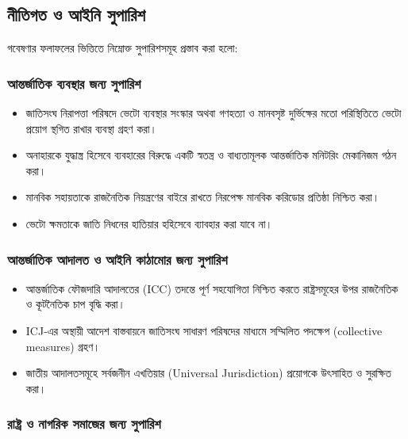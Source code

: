 \subsection{নীতিগত ও আইনি
সুপারিশ}\label{ux9a8ux9a4ux997ux9a4-ux993-ux986ux987ux9a8-ux9b8ux9aaux9b0ux9b6}

গবেষণার ফলাফলের ভিত্তিতে নিম্নোক্ত সুপারিশসমূহ প্রস্তাব করা হলো:

\subsubsection{আন্তর্জাতিক ব্যবস্থার জন্য
সুপারিশ}\label{ux986ux9a8ux9a4ux9b0ux99cux9a4ux995-ux9acux9afux9acux9b8ux9a5ux9b0-ux99cux9a8ux9af-ux9b8ux9aaux9b0ux9b6}

\begin{itemize}
\item
  জাতিসংঘ নিরাপত্তা পরিষদে ভেটো ব্যবস্থার সংস্কার অথবা গণহত্যা ও মানবসৃষ্ট
  দুর্ভিক্ষের মতো পরিস্থিতিতে ভেটো প্রয়োগ স্থগিত রাখার ব্যবস্থা গ্রহণ করা।
\item
  অনাহারকে যুদ্ধাস্ত্র হিসেবে ব্যবহারের বিরুদ্ধে একটি স্বতন্ত্র ও বাধ্যতামূলক
  আন্তর্জাতিক মনিটরিং মেকানিজম গঠন করা।
\item
  মানবিক সহায়তাকে রাজনৈতিক নিয়ন্ত্রণের বাইরে রাখতে নিরপেক্ষ মানবিক করিডোর
  প্রতিষ্ঠা নিশ্চিত করা।
\item ভেটো ক্ষমতাকে জাতি নিধনের হাতিয়ার হহিসেবে ব্যাবহার করা যাবে না। 
\end{itemize}

\subsubsection{আন্তর্জাতিক আদালত ও আইনি কাঠামোর জন্য
সুপারিশ}\label{ux986ux9a8ux9a4ux9b0ux99cux9a4ux995-ux986ux9a6ux9b2ux9a4-ux993-ux986ux987ux9a8-ux995ux9a0ux9aeux9b0-ux99cux9a8ux9af-ux9b8ux9aaux9b0ux9b6}

\begin{itemize}
\item
  আন্তর্জাতিক ফৌজদারি আদালতের (ICC) তদন্তে পূর্ণ সহযোগিতা নিশ্চিত করতে
  রাষ্ট্রসমূহের উপর রাজনৈতিক ও কূটনৈতিক চাপ বৃদ্ধি করা।
\item
  ICJ-এর অস্থায়ী আদেশ বাস্তবায়নে জাতিসংঘ সাধারণ পরিষদের মাধ্যমে সম্মিলিত
  পদক্ষেপ (collective measures) গ্রহণ।
\item
  জাতীয় আদালতসমূহে সর্বজনীন এখতিয়ার (Universal Jurisdiction) প্রয়োগকে
  উৎসাহিত ও সুরক্ষিত করা।
\end{itemize}

\subsubsection{রাষ্ট্র ও নাগরিক সমাজের জন্য
সুপারিশ}\label{ux9b0ux9b7ux99fux9b0-ux993-ux9a8ux997ux9b0ux995-ux9b8ux9aeux99cux9b0-ux99cux9a8ux9af-ux9b8ux9aaux9b0ux9b6}

